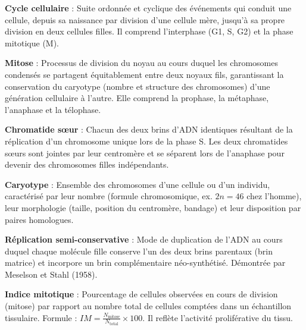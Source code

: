 \documentclass[11pt]{article}
\newcommand{\cle}[1]{{\popxbold\color{popdark}#1}}
\begin{document}
\begin{corrige}
\textbf{\cle{Cycle cellulaire}} : Suite ordonnée et cyclique des événements qui conduit une cellule, depuis sa naissance par division d'une cellule mère, jusqu'à sa propre division en deux cellules filles. Il comprend l'interphase (G1, S, G2) et la phase mitotique (M).

\textbf{\cle{Mitose}} : Processus de division du noyau au cours duquel les chromosomes condensés se partagent équitablement entre deux noyaux fils, garantissant la conservation du caryotype (nombre et structure des chromosomes) d'une génération cellulaire à l'autre. Elle comprend la prophase, la métaphase, l'anaphase et la télophase.

\textbf{\cle{Chromatide sœur}} : Chacun des deux brins d'ADN identiques résultant de la réplication d'un chromosome unique lors de la phase S. Les deux chromatides sœurs sont jointes par leur centromère et se séparent lors de l'anaphase pour devenir des chromosomes filles indépendants.

\textbf{\cle{Caryotype}} : Ensemble des chromosomes d'une cellule ou d'un individu, caractérisé par leur nombre (formule chromosomique, ex. $2n=46$ chez l'homme), leur morphologie (taille, position du centromère, bandage) et leur disposition par paires homologues.

\textbf{\cle{Réplication semi-conservative}} : Mode de duplication de l'ADN au cours duquel chaque molécule fille conserve l'un des deux brins parentaux (brin matrice) et incorpore un brin complémentaire néo-synthétisé. Démontrée par Meselson et Stahl (1958).

\textbf{\cle{Indice mitotique}} : Pourcentage de cellules observées en cours de division (mitose) par rapport au nombre total de cellules comptées dans un échantillon tissulaire. Formule : $IM = \frac{N_{\text{mitose}}}{N_{\text{total}}} \times 100$. Il reflète l'activité proliférative du tissu.
\end{corrige}
\end{document}
